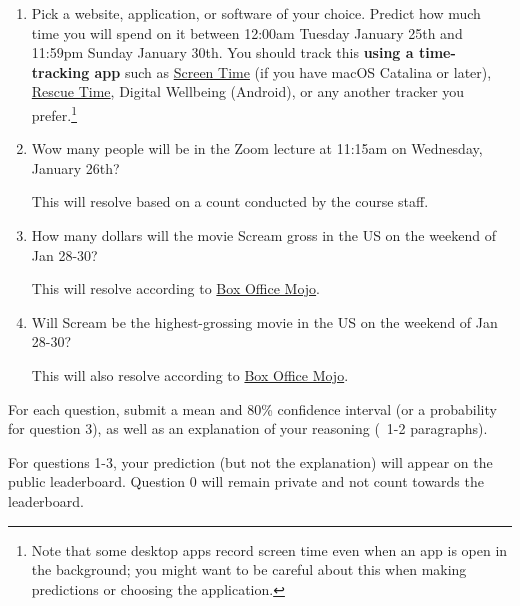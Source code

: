 \documentclass[11pt]{article}
\begin{document}
\begin{enumerate}
\item[0.] Pick a website, application, or software of your choice. Predict how much time you will spend on it between 12:00am Tuesday January 25th and 11:59pm Sunday January 30th. You should track this {\bf using a time-tracking app} such as \href{https://support.apple.com/en-us/HT210387}{Screen Time} (if you have macOS Catalina or later), \href{https://www.rescuetime.com/}{Rescue Time}, Digital Wellbeing (Android), or any another tracker you prefer.\footnote{Note that some desktop apps record screen time even when an app is open in the background; you might want to be careful about this when making predictions or choosing the application.}

\item[1.] Wow many people will be in the Zoom lecture at 11:15am on Wednesday, January 26th?

      This will resolve based on a count conducted by the course staff.

\item[2.] How many dollars will the movie Scream gross in the US on the weekend of Jan 28-30? 

      This will resolve according to \href{https://www.boxofficemojo.com/release/rl307200769/weekend/?ref_=bo_rl_tab#tabs}{Box Office Mojo}.

\item[3.] Will Scream be the highest-grossing movie in the US on the weekend of Jan 28-30?

      This will also resolve according to \href{https://www.boxofficemojo.com/weekend/?ref_=bo_nb_wey_secondarytab}{Box Office Mojo}.

\end{enumerate}
 
For each question, submit a mean and 80\% confidence interval (or a probability for question 3), 
as well as an explanation of your reasoning (~1-2 paragraphs).

For questions 1-3, your prediction (but not the explanation) will appear on the public leaderboard. 
Question 0 will remain private and not count towards the leaderboard.
\end{document}
